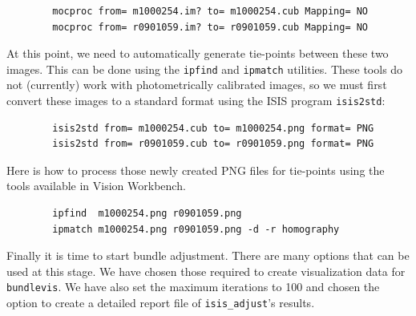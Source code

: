 \begin{verbatim}
        mocproc from= m1000254.im? to= m1000254.cub Mapping= NO
        mocproc from= r0901059.im? to= r0901059.cub Mapping= NO
\end{verbatim}

At this point, we need to automatically generate tie-points between
these two images.  This can be done using the \texttt{ipfind} and
\texttt{ipmatch} utilities.  These tools do not (currently) work
with photometrically calibrated images, so we must first convert
these images to a standard format using the ISIS program \texttt{isis2std}:

\begin{verbatim}
        isis2std from= m1000254.cub to= m1000254.png format= PNG
        isis2std from= r0901059.cub to= r0901059.png format= PNG
\end{verbatim}

Here is how to process those newly created PNG files for tie-points
using the tools available in Vision Workbench.

\begin{verbatim}
        ipfind  m1000254.png r0901059.png
        ipmatch m1000254.png r0901059.png -d -r homography
\end{verbatim}

\begin{center}
\end{center}

Finally it is time to start bundle adjustment. There are many options
that can be used at this stage.  We have chosen those required to
create visualization data for \texttt{bundlevis}.  We have also set
the maximum iterations to 100 and chosen the option to create a
detailed report file of \texttt{isis\_adjust}'s results.

